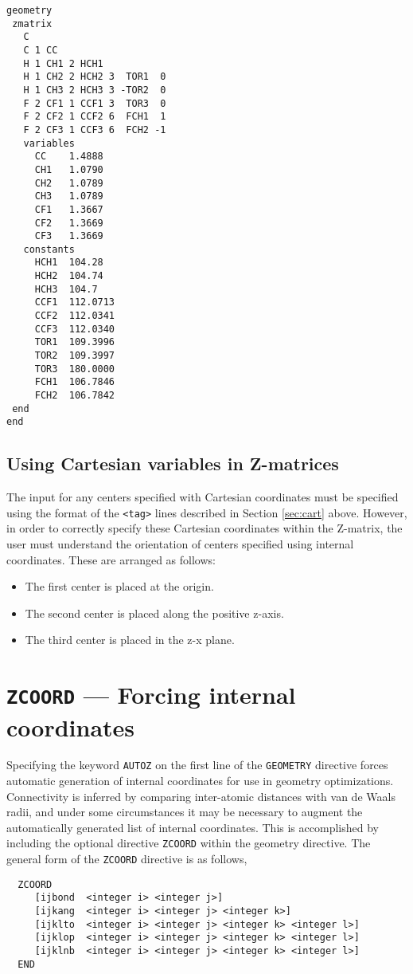 \begin{verbatim}
geometry 
 zmatrix
   C 
   C 1 CC 
   H 1 CH1 2 HCH1 
   H 1 CH2 2 HCH2 3  TOR1  0 
   H 1 CH3 2 HCH3 3 -TOR2  0 
   F 2 CF1 1 CCF1 3  TOR3  0 
   F 2 CF2 1 CCF2 6  FCH1  1 
   F 2 CF3 1 CCF3 6  FCH2 -1
   variables
     CC    1.4888 
     CH1   1.0790 
     CH2   1.0789  
     CH3   1.0789  
     CF1   1.3667 
     CF2   1.3669 
     CF3   1.3669
   constants
     HCH1  104.28 
     HCH2  104.74 
     HCH3  104.7 
     CCF1  112.0713 
     CCF2  112.0341 
     CCF3  112.0340 
     TOR1  109.3996 
     TOR2  109.3997 
     TOR3  180.0000 
     FCH1  106.7846 
     FCH2  106.7842
 end   
end
\end{verbatim}

\subsection{Using Cartesian variables in Z-matrices}
\label{sec:zmcart}

The input for any centers specified with Cartesian coordinates must
be specified using the format of the \verb+<tag>+ lines described
in Section \ref{sec:cart} above.  However, in
order to correctly specify these Cartesian coordinates 
within the Z-matrix, the user must
understand the orientation of centers specified using
internal coordinates.  These are arranged as follows:
\begin{itemize}
\item The first center is placed at the origin.
\item The second center is placed along the positive z-axis.
\item The third center is placed in the z-x plane.
\end{itemize}

\section{{\tt ZCOORD} --- Forcing internal coordinates}
\label{sec:zcoord}

Specifying the keyword \verb+AUTOZ+ on the first line of the
\verb+GEOMETRY+ directive forces automatic generation of internal
coordinates for use in geometry optimizations.  Connectivity is
inferred by comparing inter-atomic distances with van de Waals radii,
and under some circumstances it may be necessary to augment the
automatically generated list of internal coordinates.  This is
accomplished by including the optional directive {\tt ZCOORD} within
the geometry directive.  The general form of the \verb+ZCOORD+
directive is as follows,
\begin{verbatim}
  ZCOORD
     [ijbond  <integer i> <integer j>]
     [ijkang  <integer i> <integer j> <integer k>]
     [ijklto  <integer i> <integer j> <integer k> <integer l>]
     [ijklop  <integer i> <integer j> <integer k> <integer l>]
     [ijklnb  <integer i> <integer j> <integer k> <integer l>]
  END
\end{verbatim}

